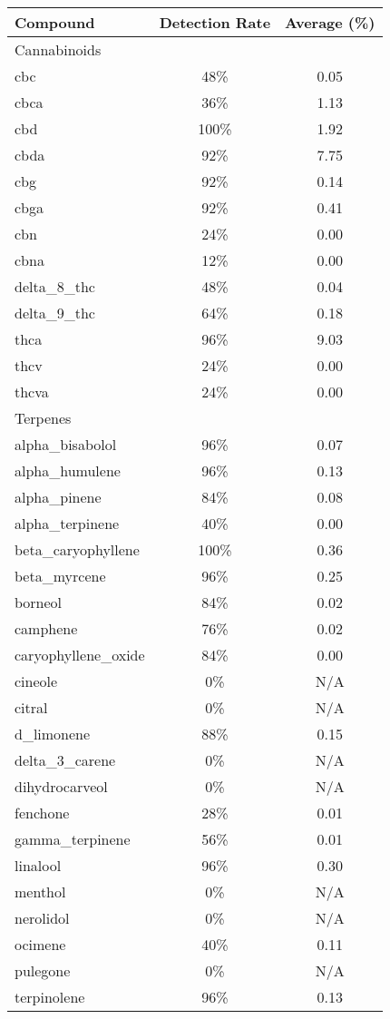 
\begin{table}[H]
\centering
\begin{tabular}{lcc}
\hline
Compound & Detection Rate & Average (\%) \\
\hline
\multicolumn{3}{l}{Cannabinoids} \\
\hline
cbc & 48\% & 0.05 \\
cbca & 36\% & 1.13 \\
cbd & 100\% & 1.92 \\
cbda & 92\% & 7.75 \\
cbg & 92\% & 0.14 \\
cbga & 92\% & 0.41 \\
cbn & 24\% & 0.00 \\
cbna & 12\% & 0.00 \\
delta\_8\_thc & 48\% & 0.04 \\
delta\_9\_thc & 64\% & 0.18 \\
thca & 96\% & 9.03 \\
thcv & 24\% & 0.00 \\
thcva & 24\% & 0.00 \\

\hline
\multicolumn{3}{l}{Terpenes} \\
\hline
alpha\_bisabolol & 96\% & 0.07 \\
alpha\_humulene & 96\% & 0.13 \\
alpha\_pinene & 84\% & 0.08 \\
alpha\_terpinene & 40\% & 0.00 \\
beta\_caryophyllene & 100\% & 0.36 \\
beta\_myrcene & 96\% & 0.25 \\
borneol & 84\% & 0.02 \\
camphene & 76\% & 0.02 \\
caryophyllene\_oxide & 84\% & 0.00 \\
cineole & 0\% & N/A \\
citral & 0\% & N/A \\
d\_limonene & 88\% & 0.15 \\
delta\_3\_carene & 0\% & N/A \\
dihydrocarveol & 0\% & N/A \\
fenchone & 28\% & 0.01 \\
gamma\_terpinene & 56\% & 0.01 \\
linalool & 96\% & 0.30 \\
menthol & 0\% & N/A \\
nerolidol & 0\% & N/A \\
ocimene & 40\% & 0.11 \\
pulegone & 0\% & N/A \\
terpinolene & 96\% & 0.13 \\

\hline
\end{tabular}
\end{table}
